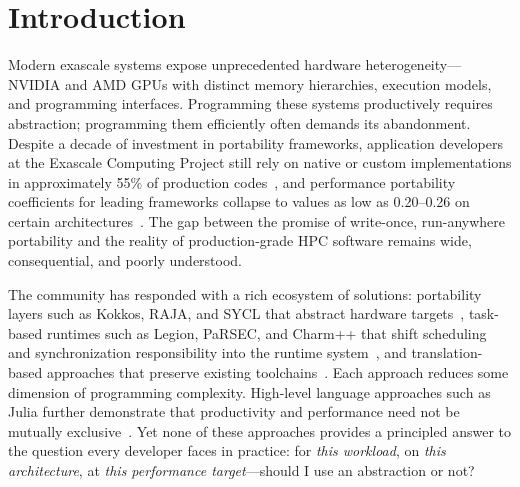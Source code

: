 
\section{Introduction}
\label{sec:introduction}

Modern exascale systems expose unprecedented hardware heterogeneity---NVIDIA
and AMD GPUs with distinct memory hierarchies, execution models, and
programming interfaces. Programming these systems productively requires
abstraction; programming them efficiently often demands its abandonment. Despite
a decade of investment in portability frameworks, application developers at the
Exascale Computing Project still rely on native or custom implementations in
approximately 55\% of production codes~\cite{Evans2022}, and performance
portability coefficients for leading frameworks collapse to values as low as
0.20--0.26 on certain architectures~\cite{Godoy2023}. The gap between the
promise of write-once, run-anywhere portability and the reality of
production-grade HPC software remains wide, consequential, and poorly
understood.

The community has responded with a rich ecosystem of solutions: portability
layers such as Kokkos, RAJA, and SYCL that abstract hardware
targets~\cite{Evans2022,heroux2020ecp}, task-based runtimes such as
Legion, PaRSEC, and Charm++ that shift scheduling and synchronization
responsibility into the runtime system~\cite{bauer2012legion,john2023multgpu,chandrasekar2023adaptive},
and translation-based approaches that preserve existing
toolchains~\cite{zhao2023hiplz}. Each approach reduces some dimension of
programming complexity. High-level language approaches such as Julia further
demonstrate that productivity and performance need not be mutually
exclusive~\cite{Godoy2023}. Yet none of these approaches
provides a principled answer to the question every developer faces in practice:
for \emph{this workload}, on \emph{this architecture}, at \emph{this
performance target}---should I use an abstraction or not?

